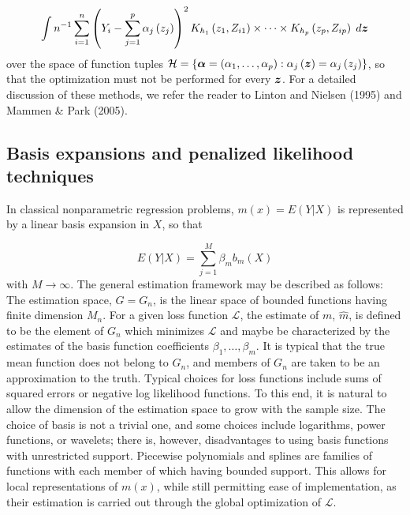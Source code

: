 \documentclass[12pt]{article}
\newcommand{\bfalpha}{\mbox{\boldmath $\alpha$}}
\newcommand{\bfz}{\mbox{\boldmath $z$}}
\begin{document}
\[
\int n^{-1} \sum_{i=1}^n \left( Y_i - \sum_{j=1}^p \alpha_j\left(z_j\right) \right)^2 K_{h_1}\left(z_1,Z_{i1}\right) \times \dots \times K_{h_p}\left(z_p,Z_{ip}\right) \;d\bfz
\]
\noindent
over the space of function tuples $\mathcal{H} = \lbrace \bfalpha = \left(\alpha_1,\dots, \alpha_p\right):\alpha_j\left(\bfz\right) = \alpha_j\left(z_j\right) \rbrace$, so that the optimization must not be performed for every $\bfz$. For a detailed discussion of these methods, we refer the reader to Linton and Nielsen (1995) and Mammen \& Park (2005). 





\subsection{Basis expansions and penalized likelihood techniques} \label{VC_spline_models}

In classical nonparametric regression problems, $m\left(x\right) = E\left(Y\vert X\right)$ is represented by a linear basis expansion in $X$, so that

\[
E\left(Y \vert X\right) = \sum_{j=1}^M \beta_m b_m\left(X\right)
\]
\noindent
with $M \rightarrow \infty$. The general estimation framework may be described as follows: The estimation space, $G = G_n$, is the linear space of bounded functions having finite dimension $M_n$. For a given loss function $\mathcal{L}$, the estimate of $m$, $\hat{m}$, is defined to be the element of $G_n$ which minimizes $\mathcal{L}$ and maybe be characterized by the estimates of the basis function coefficients $\beta_1,\dots, \beta_m$. It is typical that the true mean function does not belong to $G_n$, and members of $G_n$ are taken to be an approximation to the truth. Typical choices for loss functions include sums of squared errors or negative log likelihood functions. To this end, it is natural to allow the dimension of the estimation space to grow with the sample size. The choice of basis is not a trivial one, and some choices include logarithms, power functions, or wavelets; there is, however, disadvantages to using basis functions with unrestricted support. Piecewise polynomials and splines are families of functions with each member of which having bounded support. This allows for local representations of $m\left(x\right)$, while still permitting ease of implementation, as their estimation is carried out through the global optimization of $\mathcal{L}$. 
\end{document}
